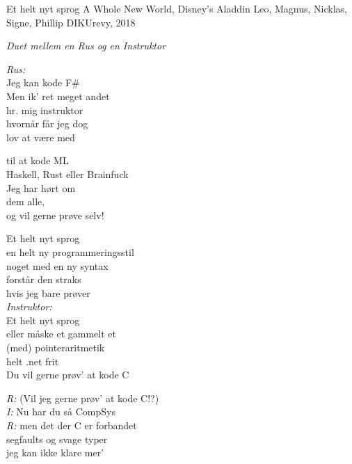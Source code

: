 \begin{song}{Et helt nyt sprog}
  {} %
  {A Whole New World, Disney's Aladdin} %
  {Leo, Magnus, Nicklas, Signe, Phillip} %
  {DIKUrevy, 2018} %
  {\NotCCLIed} %

  \begin{SBSection*}
    \emph{Duet mellem en Rus og en Instruktor}
  \end{SBSection*}
  \begin{SBVerse}
    \emph{Rus:} \\
    Jeg kan kode F\# \\
    Men ik' ret meget andet \\
    hr. mig instruktor \\ %
    hvornår får jeg dog \\
    lov at være med \\\medskip

	  til at kode ML \\
    Haskell, Rust eller Brainfuck \\
    Jeg har hørt om \\
    dem alle, \\
    og vil gerne prøve selv!
  \end{SBVerse}

  \begin{SBChorus}
    Et helt nyt sprog \\
    en helt ny programmeringsstil \\
    noget med en ny syntax \\
    forstår den straks \\
    hvis jeg bare prøver \\\medskip
    \emph{Instruktor:} \\
    Et helt nyt sprog  \\
    eller måske et gammelt et \\
    (med) pointeraritmetik \\
    helt .net frit \\
    Du vil gerne prøv' at kode C
  \end{SBChorus}

  \begin{SBVerse}
    \emph{R:} (Vil jeg gerne prøv' at kode C!?) \\
    \emph{I:} Nu har du så CompSys \\
    \emph{R:} men det der C er forbandet \\
    segfaults og svage typer \\
    jeg kan ikke klare mer' \\ \medskip


\end{SBVerse}
\end{song}

